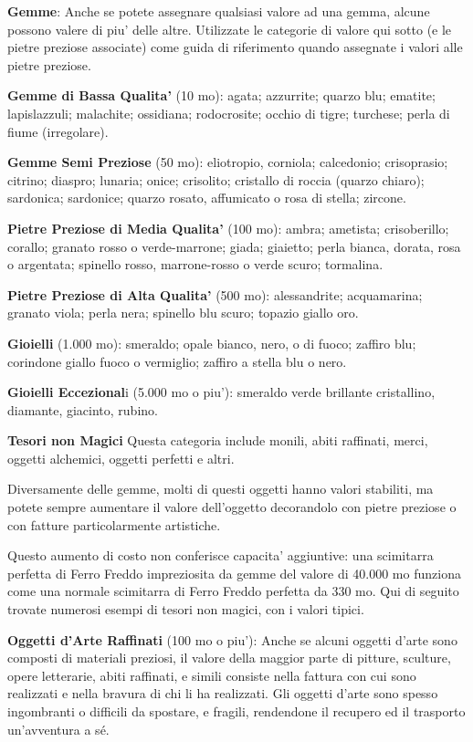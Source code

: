 \documentclass[a4paper,11pt,twoside,openany]{book}
\begin{document}
{		\textbf{Gemme}: Anche se potete assegnare qualsiasi valore ad una gemma, alcune possono valere di piu' delle altre. Utilizzate le categorie di valore qui sotto (e le pietre preziose associate) come guida di riferimento quando assegnate i valori alle pietre preziose.
		
		\textbf{Gemme di Bassa Qualita'} (10 mo): agata; azzurrite; quarzo blu; ematite; lapislazzuli; malachite; ossidiana; rodocrosite; occhio di tigre; turchese; perla di fiume (irregolare).
		
		\textbf{Gemme Semi Preziose} (50 mo): eliotropio, corniola; calcedonio; crisoprasio; citrino; diaspro; lunaria; onice; crisolito; cristallo di roccia (quarzo chiaro); sardonica; sardonice; quarzo rosato, affumicato o rosa di stella; zircone.
		
		\textbf{Pietre Preziose di Media Qualita'} (100 mo): ambra; ametista;
		crisoberillo; corallo; granato rosso o verde-marrone; giada; giaietto;
		perla bianca, dorata, rosa o argentata; spinello rosso, marrone-rosso
		o verde scuro; tormalina.
		
		\textbf{Pietre Preziose di Alta Qualita'} (500 mo): alessandrite; acquamarina; granato viola; perla nera; spinello blu scuro; topazio giallo oro.
		
		\textbf{Gioielli} (1.000 mo): smeraldo; opale bianco, nero, o di fuoco; zaffiro blu; corindone giallo fuoco o vermiglio; zaffiro a stella blu o nero.
		
		\textbf{Gioielli Eccezional}i (5.000 mo o piu'): smeraldo verde brillante cristallino, diamante, giacinto, rubino.
		
		\textbf{Tesori non Magici} Questa categoria include monili, abiti raffinati, merci, oggetti alchemici, oggetti perfetti e altri.
		
		Diversamente delle gemme, molti di questi oggetti hanno valori stabiliti, ma potete sempre aumentare il valore dell'oggetto decorandolo con pietre preziose o con fatture particolarmente artistiche.
		
		Questo aumento di costo non conferisce capacita' aggiuntive: una scimitarra perfetta di Ferro Freddo impreziosita da gemme del valore di 40.000 mo funziona come una normale scimitarra di Ferro Freddo perfetta da 330 mo. Qui di seguito trovate numerosi esempi di tesori non magici, con i valori tipici.
		
		\textbf{Oggetti d'Arte Raffinati} (100 mo o piu'): Anche se alcuni oggetti d'arte sono composti di materiali preziosi, il valore della maggior parte di pitture, sculture, opere letterarie, abiti raffinati, e simili consiste nella fattura con cui sono realizzati e nella bravura di chi li ha realizzati. Gli oggetti d'arte sono spesso ingombranti o difficili da spostare, e fragili, rendendone il recupero ed il trasporto un'avventura a sé.
		
}
\end{document}
